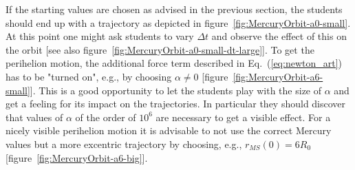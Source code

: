 \documentclass[12pt,ngerman,american]{iopart}
\begin{document}
If the starting values are chosen as advised in the previous section, the students should end up with a trajectory as depicted in figure~\ref{fig:MercuryOrbit-a0-small}.
At this point one might ask students to vary $\Delta t$ and observe the effect of this on the orbit [see also figure~\ref{fig:MercuryOrbit-a0-small-dt-large}].
To get the perihelion motion, the additional force term described in Eq.~(\ref{eq:newton_art}) has to be "turned on", e.g., by choosing  $\alpha\neq0$
[figure~\ref{fig:MercuryOrbit-a6-small}].
This is a good opportunity to let the students play with the size of $\alpha$ and get a feeling for its impact on the trajectories. In particular
they should discover that values of $\alpha$ of the order of $10^6$ are necessary to get a visible effect.
For a nicely visible perihelion motion it is advisable to not use the correct Mercury values but a more excentric trajectory by choosing, e.g., $r_{MS}(0)=6R_0$ [figure~\ref{fig:MercuryOrbit-a6-big}].
\end{document}
